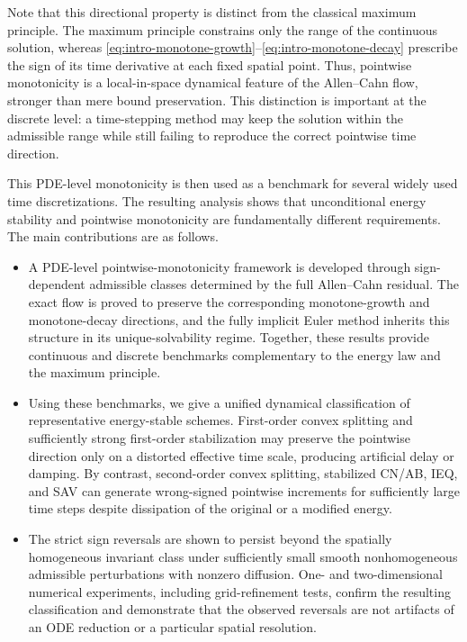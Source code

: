 \documentclass[final, 3p, times]{elsarticle}%
\begin{document}
Note that this directional property is distinct from the classical maximum principle. The maximum principle constrains only the range of the continuous solution, whereas \eqref{eq:intro-monotone-growth}--\eqref{eq:intro-monotone-decay} prescribe the sign of its time derivative at each fixed spatial point. Thus, pointwise monotonicity is a local-in-space dynamical feature of the Allen--Cahn flow, stronger than mere bound preservation. This distinction is important at the discrete level: a time-stepping method may keep the solution within the admissible range while still failing to reproduce the correct pointwise time direction.

This PDE-level monotonicity is then used as a benchmark for several widely used time discretizations. The resulting analysis shows that unconditional energy stability and pointwise monotonicity are fundamentally different requirements. The main contributions are as follows.
\begin{itemize}[leftmargin=2em]
    \item A PDE-level pointwise-monotonicity framework is developed through sign-dependent admissible classes determined by the full Allen--Cahn residual. The exact flow is proved to preserve the corresponding monotone-growth and monotone-decay directions, and the fully implicit Euler method inherits this structure in its unique-solvability regime. Together, these results provide continuous and discrete benchmarks complementary to the energy law and the maximum principle.

    \item Using these benchmarks, we give a unified dynamical classification of representative energy-stable schemes. First-order convex splitting and sufficiently strong first-order stabilization may preserve the pointwise direction only on a distorted effective time scale, producing artificial delay or damping. By contrast, second-order convex splitting, stabilized CN/AB, IEQ, and SAV can generate wrong-signed pointwise increments for sufficiently large time steps despite dissipation of the original or a modified energy.

    \item The strict sign reversals are shown to persist beyond the spatially homogeneous invariant class under sufficiently small smooth nonhomogeneous admissible perturbations with nonzero diffusion. One- and two-dimensional numerical experiments, including grid-refinement tests, confirm the resulting classification and demonstrate that the observed reversals are not artifacts of an ODE reduction or a particular spatial resolution.
\end{itemize}
\end{document}
